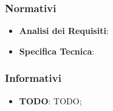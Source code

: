 		\subsubsection{Normativi} %
		\label{ssub:normativi}
			\begin{itemize}
				\item \textbf{Analisi dei Requisiti}: \docNameVersionAdR
				\item \textbf{Specifica Tecnica}: \docNameVersionST
			\end{itemize}


		\subsubsection{Informativi} %
		\label{ssub:informativi}
			\begin{itemize}
				\item \textbf{TODO}: TODO;
			\end{itemize}



